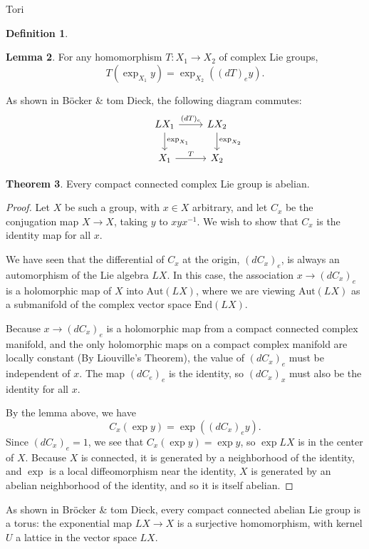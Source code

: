 \documentclass[12pt]{article}
\theoremstyle{definition}
\newtheorem{theorem}{Theorem}[section]
\newtheorem{lemma}[theorem]{Lemma}
\newtheorem{definition}[theorem]{Definition}
\begin{document}
\begin{section}{Tori}
\begin{definition}
		\label{clg}
	\end{definition}
	\begin{lemma}
		For any homomorphism $T: X_1 \to X_2$ of complex Lie groups,
		\[ T(\exp_{X_1}y) = \exp_{X_2}( (dT)_ey).\] 
		\par As shown in B\"ocker \& tom Dieck, the following diagram commutes:
	\[\begin{tikzcd}&LX_1 \arrow[r, "(dT)_e"] \arrow[d, "\exp_{X_1}"] &LX_2 \arrow[d, "\exp_{X_2}"]\\&X_1 \arrow[r, "T"] & X_2\end{tikzcd}\]
		\label{exp}
	\end{lemma}
	\begin{theorem}
		Every compact connected complex Lie group is abelian.
		\label{abelian}
		\begin{proof}
			Let $X$ be such a group, with $x \in X$ arbitrary, and let $C_x$ be the conjugation map $X \to X$, taking $y$ to $xyx^{-1}$. We wish to show that $C_x$ is the identity map for all $x$. 
			\par We have seen that the differential of $C_x$ at the origin, $(dC_x)_e$, is always an automorphism of the Lie algebra $LX$. In this case, the association $x \to (dC_x)_e$ is a holomorphic map of $X$ into $\text{Aut}(LX)$, where we are viewing $\text{Aut}(LX)$ as a submanifold of the complex vector space $\text{End}(LX)$.  
			\par Because $x \to (dC_x)_e$ is a holomorphic map from a compact connected complex manifold, and the only holomorphic maps on a compact complex manifold are locally constant (By Liouville's Theorem), the value of $(dC_x)_e$ must be independent of $x$. The map $(dC_e)_e$ is the identity, so $(dC_x)_x$ must also be the identity for all $x$. 
			\par By the lemma above, we have
			\[C_x(\exp y) = \exp( (dC_x)_e y).\]
			Since $(dC_x)_e = 1$, we see that $C_x(\exp y) = \exp y$, so $\exp LX$ is in the center of $X$. Because $X$ is connected, it is generated by a neighborhood of the identity, and $\exp$ is a local diffeomorphism near the identity,  $X$ is generated by an abelian neighborhood of the identity, and so it is itself abelian.
		\end{proof}
	\end{theorem}
	As shown in Br\"ocker \& tom Dieck, every compact connected abelian Lie group is a torus: the exponential map $LX \to X$ is a surjective homomorphism, with kernel $U$ a lattice in the vector space $LX$.
\end{section}
\end{document}
